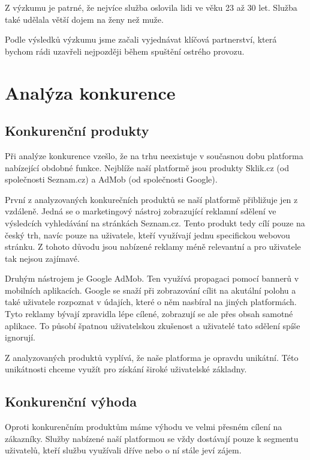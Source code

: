 \documentclass[12pt,czech]{article}
\begin{document}
Z výzkumu je patrné, že nejvíce služba oslovila lidi ve věku 23 až 30 let.
Služba také udělala větší dojem na ženy než muže.

Podle výsledků výzkumu jsme začali vyjednávat klíčová partnerství, která bychom rádi uzavřeli nejpozději během spuštění ostrého provozu.

\newpage
\section{Analýza konkurence}

\subsection{Konkurenční produkty}

Při analýze konkurence vzešlo, že na trhu neexistuje v současnou dobu platforma nabízející obdobné funkce.
Nejblíže naší platformě jsou produkty Sklik.cz (od společnosti Seznam.cz) a AdMob (od společnosti Google).

První z analyzovaných konkurečních produktů se naší platformě přibližuje jen z vzdáleně.
Jedná se o marketingový nástroj zobrazující reklamní sdělení ve výsledcích vyhledávání na stránkách Seznam.cz.
Tento produkt tedy cílí pouze na český trh, navíc pouze na uživatele, kteří využívají jednu specifickou webovou stránku.
Z tohoto důvodu jsou nabízené reklamy méně relevantní a pro uživatele tak nejsou zajímavé.

Druhým nástrojem je Google AdMob.
Ten využívá propagaci pomocí bannerů v mobilních aplikacích.
Google se snaží při zobrazování cílit na akutální polohu a také uživatele rozpoznat v údajích, které o něm nasbíral na jiných platformách.
Tyto reklamy bývají zpravidla lépe cílené, zobrazují se ale přes obsah samotné aplikace.
To působí špatnou uživatelskou zkušenost a uživatelé tato sdělení spíše ignorují.

\medskip

Z analyzovaných produktů vyplívá, že naše platforma je opravdu unikátní.
Této unikátnosti chceme využít pro získání široké uživatelské základny.

\subsection{Konkurenční výhoda}

Oproti konkurenčním produktům máme výhodu ve velmi přesném cílení na zákazníky.
Služby nabízené naší platformou se vždy dostávají pouze k segmentu uživatelů, kteří službu využívali dříve nebo o ní stále jeví zájem.
\end{document}
